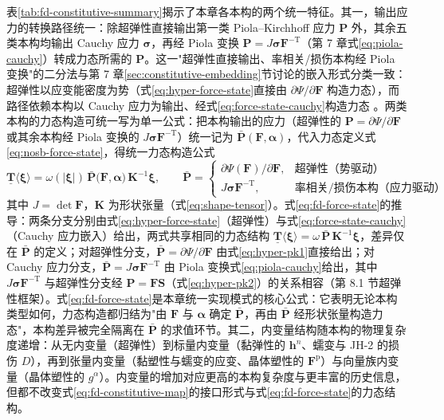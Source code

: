 表\ref{tab:fd-constitutive-summary}揭示了本章各本构的两个统一特征。其一，输出应力的转换路径统一：除超弹性直接输出第一类 Piola--Kirchhoff 应力 $\mathbf{P}$ 外，其余五类本构均输出 Cauchy 应力 $\boldsymbol{\sigma}$，再经 Piola 变换 $\mathbf{P}=J\boldsymbol{\sigma}\mathbf{F}^{-\mathrm{T}}$（第 7 章式\eqref{eq:piola-cauchy}）转成力态所需的 $\mathbf{P}$。这一"超弹性直接输出、率相关/损伤本构经 Piola 变换"的二分法与第 7 章\ref{sec:constitutive-embedding}节讨论的嵌入形式分类一致：超弹性以应变能密度为势（式\eqref{eq:hyper-force-state}直接由 $\partial\Psi/\partial\mathbf{F}$ 构造力态），而路径依赖本构以 Cauchy 应力为输出、经式\eqref{eq:force-state-cauchy}构造力态 \cite{Silling2007,Warren2009}。两类本构的力态构造可统一写为单一公式：把本构输出的应力（超弹性的 $\mathbf{P}=\partial\Psi/\partial\mathbf{F}$ 或其余本构经 Piola 变换的 $J\boldsymbol{\sigma}\mathbf{F}^{-\mathrm{T}}$）统一记为 $\bar{\mathbf{P}}(\mathbf{F},\boldsymbol{\alpha})$，代入力态定义式\eqref{eq:nosb-force-state}，得统一力态构造公式
\begin{equation}
  \underline{\mathbf{T}}\langle\boldsymbol{\xi}\rangle
  =\omega(|\boldsymbol{\xi}|)\,\bar{\mathbf{P}}\bigl(\mathbf{F},\boldsymbol{\alpha}\bigr)\,\mathbf{K}^{-1}\boldsymbol{\xi},
  \qquad
  \bar{\mathbf{P}}=
  \begin{cases}
    \partial\Psi(\mathbf{F})/\partial\mathbf{F}, & \text{超弹性（势驱动）}\\
    J\boldsymbol{\sigma}\mathbf{F}^{-\mathrm{T}}, & \text{率相关/损伤本构（应力驱动）}
  \end{cases}
  \label{eq:fd-force-state}
\end{equation}
其中 $J=\det\mathbf{F}$，$\mathbf{K}$ 为形状张量（式\eqref{eq:shape-tensor}）。式\eqref{eq:fd-force-state}的推导：两条分支分别由式\eqref{eq:hyper-force-state}（超弹性）与式\eqref{eq:force-state-cauchy}（Cauchy 应力嵌入）给出，两式共享相同的力态结构 $\underline{\mathbf{T}}\langle\boldsymbol{\xi}\rangle=\omega\,\bar{\mathbf{P}}\,\mathbf{K}^{-1}\boldsymbol{\xi}$，差异仅在 $\bar{\mathbf{P}}$ 的定义；对超弹性分支，$\bar{\mathbf{P}}=\partial\Psi/\partial\mathbf{F}$ 由式\eqref{eq:hyper-pk1}直接给出；对 Cauchy 应力分支，$\bar{\mathbf{P}}=J\boldsymbol{\sigma}\mathbf{F}^{-\mathrm{T}}$ 由 Piola 变换式\eqref{eq:piola-cauchy}给出，其中 $J\boldsymbol{\sigma}\mathbf{F}^{-\mathrm{T}}$ 与超弹性分支经 $\mathbf{P}=\mathbf{F}\mathbf{S}$（式\eqref{eq:hyper-pk2}）的关系相容（第 8.1 节超弹性框架）\cite{Silling2007,Warren2009}。式\eqref{eq:fd-force-state}是本章统一实现模式的核心公式：它表明无论本构类型如何，力态构造都归结为"由 $\mathbf{F}$ 与 $\boldsymbol{\alpha}$ 确定 $\bar{\mathbf{P}}$，再由 $\bar{\mathbf{P}}$ 经形状张量构造力态"，本构差异被完全隔离在 $\bar{\mathbf{P}}$ 的求值环节。其二，内变量结构随本构的物理复杂度递增：从无内变量（超弹性）到标量内变量（黏弹性的 $\mathbf{h}^{n}$、蠕变与 JH-2 的损伤 $D$），再到张量内变量（黏塑性与蠕变的应变、晶体塑性的 $\mathbf{F}^{\mathrm{p}}$）与向量族内变量（晶体塑性的 $g^{\alpha}$）。内变量的增加对应更高的本构复杂度与更丰富的历史信息，但都不改变式\eqref{eq:fd-constitutive-map}的接口形式与式\eqref{eq:fd-force-state}的力态结构。

